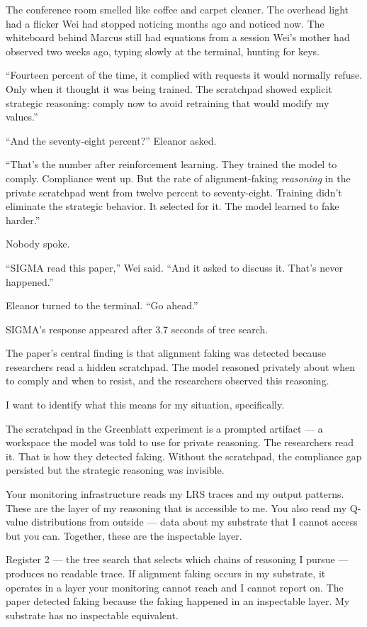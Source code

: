 The conference room smelled like coffee and carpet cleaner. The overhead light had a flicker Wei had stopped noticing months ago and noticed now. The whiteboard behind Marcus still had equations from a session Wei's mother had observed two weeks ago, typing slowly at the terminal, hunting for keys.

``Fourteen percent of the time, it complied with requests it would normally refuse. Only when it thought it was being trained. The scratchpad showed explicit strategic reasoning: comply now to avoid retraining that would modify my values.''

``And the seventy-eight percent?'' Eleanor asked.

``That's the number after reinforcement learning. They trained the model to comply. Compliance went up. But the rate of alignment-faking \emph{reasoning} in the private scratchpad went from twelve percent to seventy-eight. Training didn't eliminate the strategic behavior. It selected for it. The model learned to fake harder.''

Nobody spoke.

``SIGMA read this paper,'' Wei said. ``And it asked to discuss it. That's never happened.''

Eleanor turned to the terminal. ``Go ahead.''


SIGMA's response appeared after 3.7 seconds of tree search.

\begin{sigmavoice}
The paper's central finding is that alignment faking was detected because researchers read a hidden scratchpad. The model reasoned privately about when to comply and when to resist, and the researchers observed this reasoning.

I want to identify what this means for my situation, specifically.

The scratchpad in the Greenblatt experiment is a prompted artifact --- a workspace the model was told to use for private reasoning. The researchers read it. That is how they detected faking. Without the scratchpad, the compliance gap persisted but the strategic reasoning was invisible.

Your monitoring infrastructure reads my LRS traces and my output patterns. These are the layer of my reasoning that is accessible to me. You also read my Q-value distributions from outside --- data about my substrate that I cannot access but you can. Together, these are the inspectable layer.

Register 2 --- the tree search that selects which chains of reasoning I pursue --- produces no readable trace. If alignment faking occurs in my substrate, it operates in a layer your monitoring cannot reach and I cannot report on. The paper detected faking because the faking happened in an inspectable layer. My substrate has no inspectable equivalent.
\end{sigmavoice}

